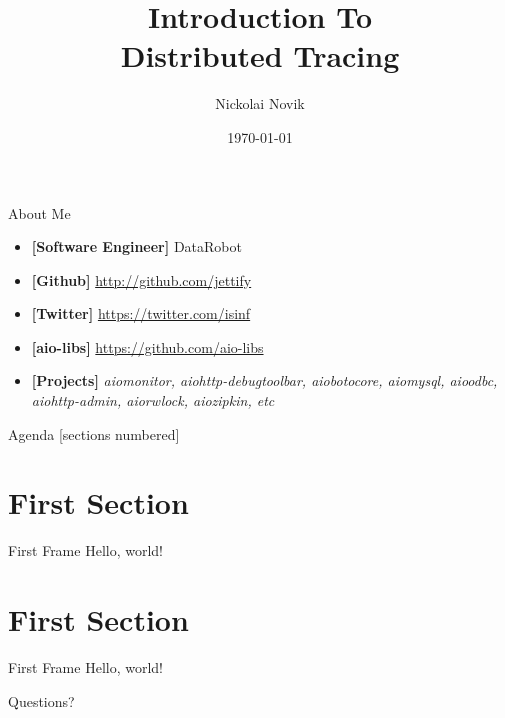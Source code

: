 \documentclass[14pt]{beamer}
\title{Introduction To \\ Distributed Tracing}
\date{\today}
\author{Nickolai Novik}
\institute{\href{http://github.com/jettify}{http://github.com/jettify}}
\begin{document}
  \maketitle
  \begin{frame}{About Me}
    \begin{itemize}
        \item \textbf{[Software Engineer]}  DataRobot
        \item \textbf{[Github]}
            \href{http://github.com/jettify}{http://github.com/jettify}
        \item \textbf{[Twitter]}
            \href{https://twitter.com/isinf}{https://twitter.com/isinf}
        \item \textbf{[aio-libs]}
            \href{https://github.com/aio-libs}{https://github.com/aio-libs}
        \item \textbf{[Projects]}
            \textit{aiomonitor, aiohttp-debugtoolbar,
          aiobotocore, aiomysql, aioodbc, aiohttp-admin, aiorwlock,
          aiozipkin, etc}
    \end{itemize}
  \end{frame}
  \begin{frame}{Agenda}
    [sections numbered]
    \tableofcontents[hideallsubsections]
  \end{frame}
  \section{First Section}
  \begin{frame}{First Frame}
    Hello, world!
  \end{frame}
  \section{First Section}
  \begin{frame}{First Frame}
    Hello, world!
  \end{frame}
\begin{frame}[standout]
  Questions?
\end{frame}
\end{document}

